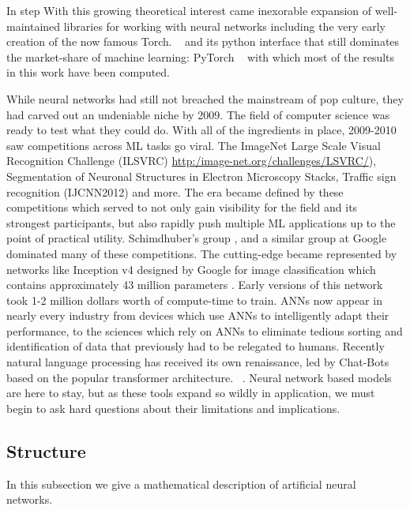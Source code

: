 In step With this growing theoretical interest came inexorable expansion of
well-maintained libraries for working with neural networks including
the very early creation of the now famous Torch.
~\cite{Collobert2002TorchAM} and its python interface that still
dominates the market-share of machine learning: PyTorch
~\cite{pytorch2019} with which most of the results in this
work have been computed. 

While neural networks had still not breached the mainstream of pop
culture, they had carved out an undeniable niche by 2009. The
field of computer science was ready to test what they could
do. With all of the ingredients in place, 2009-2010 saw competitions
across ML tasks go viral. The ImageNet Large Scale Visual Recognition
Challenge (ILSVRC) \url{http:/image-net.org/challenges/LSVRC/}), Segmentation of Neuronal Structures in Electron
Microscopy Stacks, Traffic sign recognition (IJCNN2012) and more. The
era became defined by these competitions which served to not only gain 
visibility for the field and its strongest participants, but also
rapidly push multiple ML applications up to the point of practical
utility. Schimdhuber's group
\cite{SCHMIDHUBER201585}, and a similar group at Google dominated
many of these competitions. The cutting-edge became represented by
networks like Inception v4 designed by Google for image classification
which contains approximately 43 million parameters
\cite{Szegedy2013}. Early versions of this network took 1-2 million
dollars worth of compute-time to train. ANNs now appear in nearly
every industry from devices which use ANNs to intelligently adapt
their performance, to the sciences which rely on ANNs to eliminate
tedious sorting and identification of data that previously had to be
relegated to humans. Recently natural language processing has received
its own renaissance, led by Chat-Bots based on the popular transformer
architecture. 
~\cite{vaswani2017attention}. Neural network based models are here to
stay, but as these tools expand so wildly in application, we must
begin to ask hard questions about their limitations and implications. 

\subsection{Structure}
In this subsection we give a mathematical description of artificial neural networks. 

